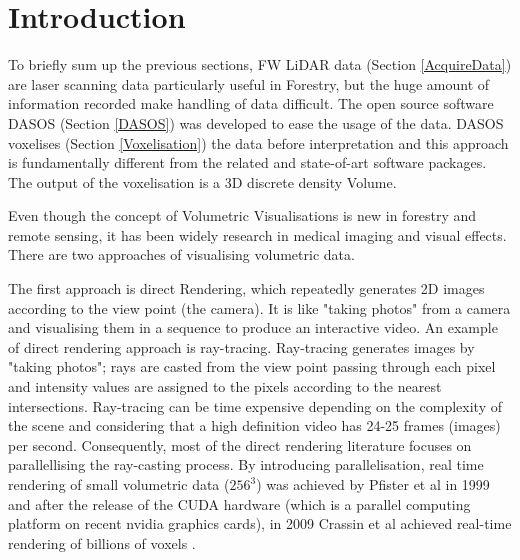 \documentclass{subfiles}
\begin{document}
	

\section{Introduction}

\par To briefly sum up the previous sections, FW LiDAR data (Section \ref{AcquireData}) are laser scanning data particularly useful in Forestry, but the huge amount of information recorded make handling of data difficult. The open source software DASOS (Section \ref{DASOS}) was developed to ease the usage of the data. DASOS voxelises (Section \ref{Voxelisation}) the data before interpretation and this approach is fundamentally different from the related and state-of-art software packages. The output of the voxelisation is a 3D discrete density Volume. 

\par Even though the concept of Volumetric Visualisations is new in forestry and remote sensing, it has been widely research in medical imaging and visual effects. There are two approaches of visualising volumetric data.

\par The first approach is direct Rendering, which repeatedly generates 2D images according to the view point (the camera). It is like "taking photos" from a camera and visualising them in a sequence to produce an interactive video. An example of direct rendering approach is ray-tracing. Ray-tracing generates images by "taking photos"; rays are casted from the view point passing through each pixel and intensity values are assigned to the pixels according to the nearest intersections. Ray-tracing can be time expensive depending on the complexity of the scene and considering that a high definition video has 24-25 frames (images) per second. Consequently, most of the direct rendering literature focuses on parallellising the ray-casting process. By introducing parallelisation, real time rendering of small volumetric data ($256^3$) was achieved by Pfister et al in 1999 \cite{Pfister1999} and after the release of the CUDA hardware (which is a parallel computing platform on recent nvidia graphics cards), in 2009 Crassin et al achieved real-time rendering of billions of voxels \cite{Crassin2009}. 
	
\end{document}
